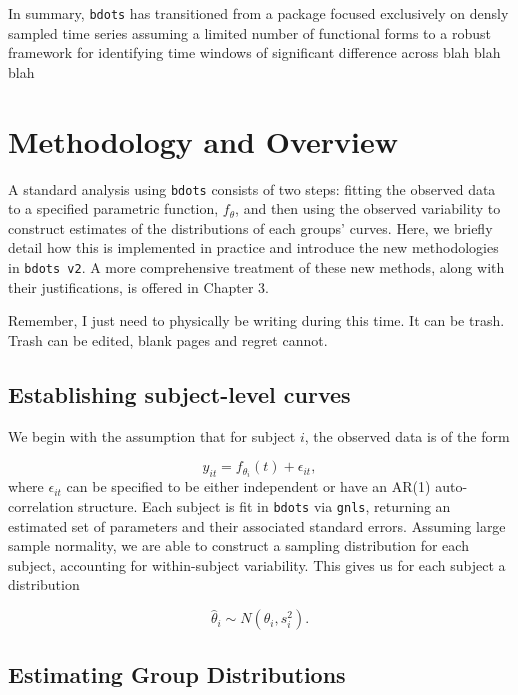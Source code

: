 \documentclass{article}
\newcommand{\xt}{\texttt}%
\begin{document}
In summary, \texttt{bdots} has transitioned from a package focused exclusively on densly sampled time series assuming a limited number of functional forms to a {\color{red} robust} framework for identifying time windows of significant difference across blah blah blah


\section{Methodology and Overview} 

A standard analysis using \xt{bdots} consists of two steps: fitting the observed data to a specified parametric function, $f_\theta$, and then using the observed variability to construct estimates of the distributions of each groups' curves.  Here, we briefly detail how this is implemented in practice and introduce the new methodologies in \xt{bdots v2}. A more comprehensive treatment of these new methods, along with their justifications, is offered in Chapter 3. 

Remember, I just need to physically be writing during this time. It can be trash. Trash can be edited, blank pages and regret cannot.

\subsection{Establishing subject-level curves}

We begin with the assumption that for subject $i$, the observed data is of the form

\begin{equation}
y_{it} = f_{\theta_i}(t) + \epsilon_{it},
\end{equation}
where $\epsilon_{it}$ can be specified to be either independent or have an AR(1) auto-correlation structure. Each subject is fit in \xt{bdots} via \xt{gnls}, returning an estimated set of parameters and their associated standard errors. Assuming large sample normality, we are able to construct a sampling distribution for each subject, accounting for within-subject variability. This gives us for each subject a distribution

\begin{equation}
\hat{\theta}_i \sim N(\theta_i, s_i^2).
\end{equation}

\subsection{Estimating Group Distributions}
\end{document}
